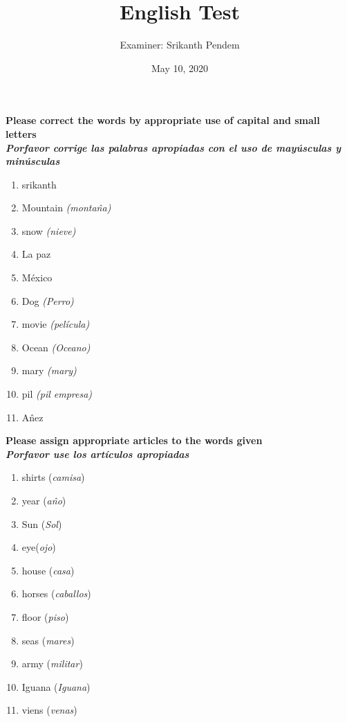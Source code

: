 \documentclass{article}
\title{English Test}
\date{May 10, 2020}
\author{Examiner: Srikanth Pendem}
\begin{document}
\newcommand\tab[1][1cm]{\hspace*{#1}}
\maketitle
\newpage
\noindent \textbf{Please correct the words by appropriate use of capital and small letters}\\
\noindent \textbf{\textit{Porfavor corrige las palabras apropiadas con el uso de mayúsculas y minúsculas}}

\begin{enumerate}
\item srikanth
\item Mountain \textit{(monta\^na)}
\item snow \textit{(nieve)}
\item La paz
\item M\'exico
\item Dog \textit{(Perro)}
\item movie \textit{(pel\'icula)}
\item Ocean \textit{(Oceano)}
\item mary \textit{(mary)}
\item pil \textit{(pil empresa)}
\item A\^nez 
\end{enumerate}

\noindent \textbf{Please assign appropriate articles to the words given}\\
\noindent \textbf{\textit{Porfavor use los artículos apropiadas}}

\begin{enumerate}
\item shirts (\textit{camisa}) 
\item year (\textit{a\^no}) 
\item Sun (\textit{Sol}) 
\item eye(\textit{ojo}) 
\item house (\textit{casa}) 
\item horses (\textit{caballos}) 
\item floor (\textit{piso}) 
\item seas (\textit{mares}) 
\item army (\textit{militar}) 
\item Iguana (\textit{Iguana}) 
\item viens (\textit{venas}) 
\end{enumerate}

\newpage
\end{document}
